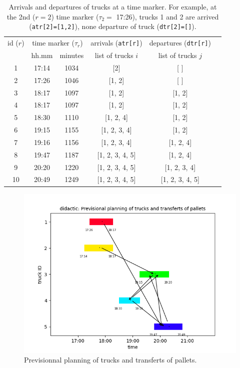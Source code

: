 \documentclass[preprint,12pt,authoryear]{elsarticle}
\begin{document}
    \begin{table}[h]
        \centering
           \begin{tabular}{| c || c | c | c | c | c |}
           \hline
           id ($r$) & \multicolumn{2}{c|}{time marker ($\tau_r$)}  & \multicolumn{1}{c|}{arrivals (\texttt{atr[r]})} & \multicolumn{1}{c|}{departures (\texttt{dtr[r]})} \\
            \cline{2-5}
           & hh.mm & minutes & list of trucks $i$ &  list of trucks $j$ \\
           \hline
              1 &   17:14 & 1034   &  [2]     & [ ] \\
              2 &   17:26 & 1046   &  [1, 2]   &  [ ] \\
              3 &   18:17 & 1097   &  [1, 2]  &   [1, 2] \\
              4 &   18:17 & 1097   &  [1, 2]   &  [1, 2] \\
              5 &   18:30 & 1110    & [1, 2, 4]  &   [1, 2] \\
              6 &   19:15 & 1155    &  [1, 2, 3, 4]  &   [1, 2] \\
              7 &   19:16 & 1156    &  [1, 2, 3, 4]  &   [1, 2, 4] \\
              8 &   19:47 & 1187    &  [1, 2, 3, 4, 5]  &   [1, 2, 4] \\
              9 &   20:20 & 1220    &  [1, 2, 3, 4, 5]  &   [1, 2, 3, 4] \\
              10 & 20:49 & 1249    &   [1, 2, 3, 4, 5]  &   [1, 2, 3, 4, 5] \\
                 \hline
           \end{tabular}
           \caption{Arrivals and departures of trucks at a time marker. For example, at the 2nd ($r=2$) time marker ($\tau_2 =$ 17:26), trucks 1 and 2 are arrived (\texttt{atr[2]=[1,2]}), none departure of truck (\texttt{dtr[2]=[]}).}
           \label{tab:timeMarkers}
    \end{table}
    
 
 \begin{figure}[t!]
       \centering
      \includegraphics[scale=0.5]{images/didacGantt.png}
%
  \caption{Previsionnal planning of trucks and transferts of pallets.}
   \label{fig:didacGantt}
\end{figure}
\end{document}

